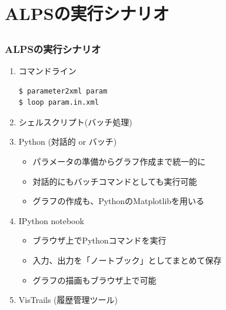 \section{ALPSの実行シナリオ}
\subsection*{\redm\whiteb\greenb}

\begin{frame}[t,fragile]
  \frametitle{ALPSの実行シナリオ}
  \begin{enumerate}
  \item コマンドライン
\begin{lstlisting}
$ parameter2xml param
$ loop param.in.xml
\end{lstlisting}
  \item シェルスクリプト(バッチ処理)
  \item Python (対話的 or バッチ)
    \begin{itemize}
    \item パラメータの準備からグラフ作成まで統一的に
    \item 対話的にもバッチコマンドとしても実行可能
    \item グラフの作成も、PythonのMatplotlibを用いる
    \end{itemize}
  \item IPython notebook
    \begin{itemize}
    \item ブラウザ上でPythonコマンドを実行
    \item 入力、出力を「ノートブック」としてまとめて保存
    \item グラフの描画もブラウザ上で可能
    \end{itemize}
  \item VisTrails (履歴管理ツール)
  \end{enumerate}
\end{frame}

\subsection*{\redm\whitem\greenb}

